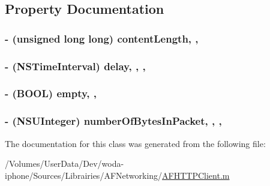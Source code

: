 \subsection{Property Documentation}
\hypertarget{interface_a_f_multipart_body_stream_aaee3ebc73e6cade317c7524089880b3d}{
\subsubsection[{content\-Length}]{\setlength{\rightskip}{0pt plus 5cm}-\/ (unsigned long long) content\-Length\hspace{0.3cm}{\ttfamily [read]}, {\ttfamily [nonatomic]}, {\ttfamily [assign]}}}\label{interface_a_f_multipart_body_stream_aaee3ebc73e6cade317c7524089880b3d}
\hypertarget{interface_a_f_multipart_body_stream_aabbac8502bef80a07707380ebadb2791}{
\subsubsection[{delay}]{\setlength{\rightskip}{0pt plus 5cm}-\/ (N\-S\-Time\-Interval) delay\hspace{0.3cm}{\ttfamily [read]}, {\ttfamily [write]}, {\ttfamily [nonatomic]}, {\ttfamily [assign]}}}\label{interface_a_f_multipart_body_stream_aabbac8502bef80a07707380ebadb2791}
\hypertarget{interface_a_f_multipart_body_stream_ae9b2a8f4b9b328d29f0b7c64410577c9}{
\subsubsection[{empty}]{\setlength{\rightskip}{0pt plus 5cm}-\/ (B\-O\-O\-L) empty\hspace{0.3cm}{\ttfamily [read]}, {\ttfamily [nonatomic]}, {\ttfamily [assign]}}}\label{interface_a_f_multipart_body_stream_ae9b2a8f4b9b328d29f0b7c64410577c9}
\hypertarget{interface_a_f_multipart_body_stream_a4f5df6b4fa6024d8bbedf72f2bef974d}{
\subsubsection[{number\-Of\-Bytes\-In\-Packet}]{\setlength{\rightskip}{0pt plus 5cm}-\/ (N\-S\-U\-Integer) number\-Of\-Bytes\-In\-Packet\hspace{0.3cm}{\ttfamily [read]}, {\ttfamily [write]}, {\ttfamily [nonatomic]}, {\ttfamily [assign]}}}\label{interface_a_f_multipart_body_stream_a4f5df6b4fa6024d8bbedf72f2bef974d}


The documentation for this class was generated from the following file\-:\begin{DoxyCompactItemize}
\item 
/\-Volumes/\-User\-Data/\-Dev/woda-\/iphone/\-Sources/\-Librairies/\-A\-F\-Networking/\hyperlink{_a_f_h_t_t_p_client_8m}{A\-F\-H\-T\-T\-P\-Client.\-m}\end{DoxyCompactItemize}
